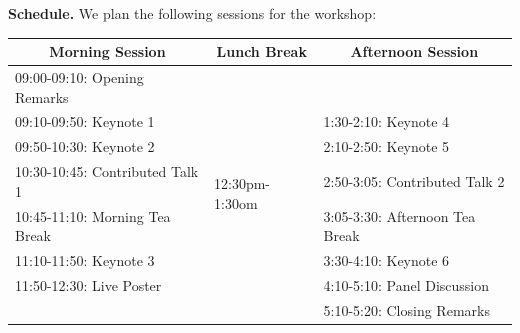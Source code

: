 \documentclass{article}
\begin{document}
\textbf{Schedule.}
We plan the following sessions for the workshop:\\
\begingroup
  \hfill
    \begin{tabular}{l|l|l}
    \toprule
    \multicolumn{1}{c|}{\textbf{Morning Session}}  & \multicolumn{1}{c|}{\textbf{Lunch Break}} & \multicolumn{1}{c}{\textbf{Afternoon Session}}  \\
    \midrule
    09:00-09:10: Opening Remarks &   \multirow{8}{*}{12:30pm-1:30om} &  \\
    09:10-09:50: Keynote 1 & & 1:30-2:10: Keynote 4  \\
    09:50-10:30: Keynote 2 & & 2:10-2:50: Keynote 5  \\
    10:30-10:45: Contributed Talk 1 & & 2:50-3:05: Contributed Talk 2  \\
    10:45-11:10: Morning Tea Break & & 3:05-3:30: Afternoon Tea Break   \\
    11:10-11:50: Keynote 3 & & 3:30-4:10: Keynote 6  \\
    11:50-12:30: Live Poster & & 4:10-5:10: Panel Discussion  \\
     & & 5:10-5:20: Closing Remarks   \\
    \bottomrule
    \end{tabular}%
\hfill
\endgroup

\newpage
 
\newpage
 
\end{document}
